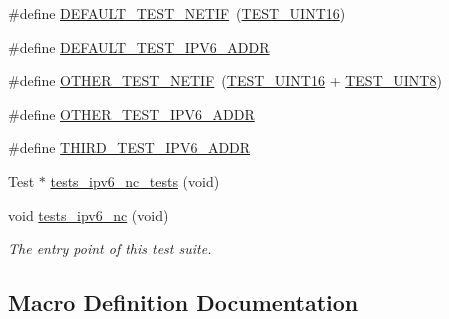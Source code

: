 \begin{DoxyCompactItemize}
\item 
\#define \hyperlink{tests-ipv6__nc_8c_a4363511a72358df34aa4f691e9862615}{D\+E\+F\+A\+U\+L\+T\+\_\+\+T\+E\+S\+T\+\_\+\+N\+E\+T\+IF}~(\hyperlink{unittests-constants_8h_ada84310dd4f52d94096d5baed5eb75e1}{T\+E\+S\+T\+\_\+\+U\+I\+N\+T16})
\item 
\#define \hyperlink{tests-ipv6__nc_8c_a6755bbe51b0b21c7587c52253b67907e}{D\+E\+F\+A\+U\+L\+T\+\_\+\+T\+E\+S\+T\+\_\+\+I\+P\+V6\+\_\+\+A\+D\+DR}
\item 
\#define \hyperlink{tests-ipv6__nc_8c_a28844d5b26d53ea819be44b1ad562be1}{O\+T\+H\+E\+R\+\_\+\+T\+E\+S\+T\+\_\+\+N\+E\+T\+IF}~(\hyperlink{unittests-constants_8h_ada84310dd4f52d94096d5baed5eb75e1}{T\+E\+S\+T\+\_\+\+U\+I\+N\+T16} + \hyperlink{unittests-constants_8h_a9a493e3e4fe69d0b8c338869ebcadbc4}{T\+E\+S\+T\+\_\+\+U\+I\+N\+T8})
\item 
\#define \hyperlink{tests-ipv6__nc_8c_a58de43c3cc07985002ae940888107785}{O\+T\+H\+E\+R\+\_\+\+T\+E\+S\+T\+\_\+\+I\+P\+V6\+\_\+\+A\+D\+DR}
\item 
\#define \hyperlink{tests-ipv6__nc_8c_aca2fb5fe61ac325bd1fd5e0e475f0e69}{T\+H\+I\+R\+D\+\_\+\+T\+E\+S\+T\+\_\+\+I\+P\+V6\+\_\+\+A\+D\+DR}
\item 
Test $\ast$ \hyperlink{tests-ipv6__nc_8c_afec00e43d22f7bde6c086d7cb05e1653}{tests\+\_\+ipv6\+\_\+nc\+\_\+tests} (void)
\item 
void \hyperlink{group__unittests_ga011adecd50fb31c2e9fb4b402259fab3}{tests\+\_\+ipv6\+\_\+nc} (void)
\begin{DoxyCompactList}\small\item\em The entry point of this test suite. \end{DoxyCompactList}\end{DoxyCompactItemize}


\subsection{Macro Definition Documentation}
\mbox{\label{tests-ipv6__nc_8c_a6755bbe51b0b21c7587c52253b67907e}} 
